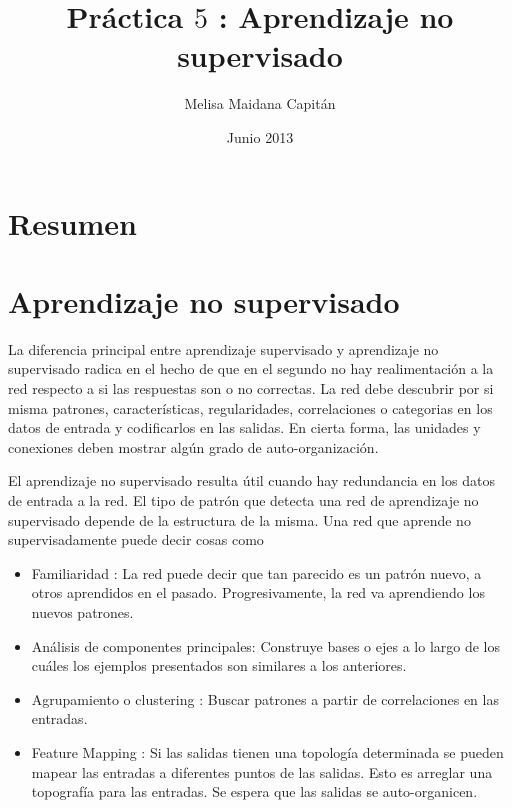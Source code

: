 \documentclass[aps,prb,onecolumn,10pt,floatfix,superscriptaddress]{article} %
\begin{document}
\title{Pr\'actica $5$ : Aprendizaje no supervisado}

\author{Melisa Maidana Capit\'an}

\date{Junio 2013} %

\maketitle 
% 

\setlength{\parindent}{30pt}
\setlength{\parskip}{2.5ex plus 0ex minus 0ex}

\section*{Resumen}

\section{Aprendizaje no supervisado}

La diferencia principal entre aprendizaje supervisado y aprendizaje no supervisado radica en el hecho de que en el segundo no hay realimentaci\'on a la red respecto a si las respuestas son o no correctas. La red debe descubrir por si misma patrones, caracter\'isticas, regularidades, correlaciones o categorias en los datos de entrada y codificarlos en las salidas. En cierta forma, las unidades y conexiones deben mostrar alg\'un grado de auto-organizaci\'on.

El aprendizaje no supervisado resulta \'util cuando hay redundancia en los datos de entrada a la red. El tipo de patr\'on que detecta una red de aprendizaje no supervisado depende de la estructura de la misma. Una red que aprende no supervisadamente puede decir cosas como

\begin{itemize}

\item Familiaridad : La red puede decir que tan parecido es un patr\'on nuevo, a otros aprendidos en el pasado. Progresivamente, la red va aprendiendo los nuevos patrones.

\item An\'alisis de componentes principales: Construye bases o ejes a lo largo de los cu\'ales los ejemplos presentados son similares a los anteriores. 

\item Agrupamiento o clustering :  Buscar patrones a partir de correlaciones en las entradas.

\item Feature Mapping : Si las salidas tienen una topolog\'ia determinada se pueden mapear las entradas a diferentes puntos de las salidas. Esto es arreglar una topograf\'ia para las entradas. Se espera que las salidas se auto-organicen.

\end{itemize}
\end{document}
